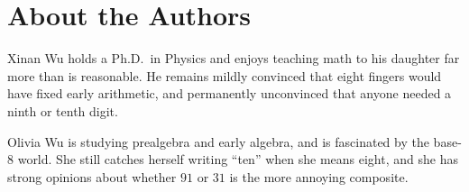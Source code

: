 \documentclass[11pt,oneside]{book}
\begin{document}
\backmatter


\chapter{About the Authors}
\label{ch:authors}

Xinan Wu holds a Ph.D.\ in Physics and enjoys teaching math to his daughter far more than is reasonable. He remains mildly convinced that eight fingers would have fixed early arithmetic, and permanently unconvinced that anyone needed a ninth or tenth digit.

Olivia Wu is studying prealgebra and early algebra, and is fascinated by the base-8 world. She still catches herself writing ``ten'' when she means eight, and she has strong opinions about whether $91$ or $31$ is the more annoying composite.

\printindex
\end{document}
